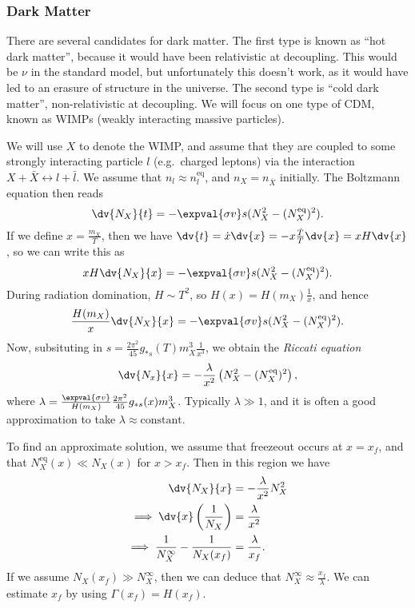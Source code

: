 \documentclass{jknotes}
\begin{document}
\subsubsection*{Dark Matter}
There are several candidates for dark matter. The first type is known as ``hot dark matter'', because it would have been relativistic at decoupling. This would be \(\nu\) in the standard model, but unfortunately this doesn't work, as it would have led to an erasure of structure in the universe. The second type is ``cold dark matter'', non-relativistic at decoupling. We will focus on one type of CDM, known as WIMPs (weakly interacting massive particles).

We will use \(X\) to denote the WIMP, and assume that they are coupled to some strongly interacting particle \(l\) (e.g.\ charged leptons) via the interaction \(X+\bar{X} \leftrightarrow l + \bar{l}\). We assume that \(n_l\approx n_l^{\text{eq}}\), and \(n_X = n_{\bar{X}}\) initially. The Boltzmann equation then reads
\begin{equation}
    \dv{N_X}{t} = -\expval{\sigma v}s(N_X^2 - (N_X^{\text{eq}})^2).
\end{equation}
If we define \(x = \frac{m_X}{T}\), then we have \(\dv{t} = \dot{x}\dv{x} = -x\frac{\dot{T}}{T}\dv{x} = xH\dv{x}\), so we can write this as
\begin{equation}
    xH\dv{N_X}{x} = -\expval{\sigma v}s(N_X^2 - (N_X^{\text{eq}})^2).
\end{equation}
During radiation domination, \(H\sim T^2\), so \(H(x) = H(m_X)\frac1{x}\), and hence
\begin{equation}
    \frac{H(m_X)}{x}\dv{N_X}{x} = -\expval{\sigma v}s(N_X^2 - (N_X^{\text{eq}})^2).
\end{equation}
Now, subsituting in \(s = \frac{2\pi^2}{45}g_{*s}(T)m_X^3\frac{1}{x^3}\), we obtain the \emph{Riccati equation}
\begin{equation}
    \dv{N_x}{x} = -\frac\lambda{x^2}\left(N_X^2-(N_X^{\text{eq}})^2\right),
\end{equation}
where \(\lambda = \frac{\expval{\sigma v}}{H(m_X)} \frac{2\pi^2}{45} g_{*s}(x)m_X^3\). Typically \(\lambda \gg 1\), and it is often a good approximation to take \(\lambda \approx \text{constant}\).

To find an approximate solution, we assume that freezeout occurs at \(x=x_f\), and that \(N_X^{\text{eq}}(x) \ll N_X(x)\) for \(x > x_f\). Then in this region we have
\begin{align}
    \dv{N_X}{x} &= -\frac\lambda{x^2}N_X^2 \\
    \implies \dv{x} \left(\frac1{N_X}\right) &= \frac{\lambda}{x^2} \\
    \implies \frac1{N_X^\infty} - \frac1{N_X(x_f)} &= \frac\lambda{x_f}.
\end{align}
If we assume \(N_X(x_f)\gg N_X^\infty\), then we can deduce that \(N_X^\infty \approx \frac{x_f}{\lambda}\). We can estimate \(x_f\) by using \(\Gamma(x_f) = H(x_f)\).
\end{document}
